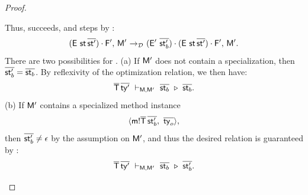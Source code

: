 {\begin{proof}
{\begin{itemize}
\begin{enumerate}
          Thus,  succeeds,
          and  steps by :
          \[
            \config{\stk{(\env\ \st\,\ol{\st'})}{\frm'}}{\mtbl'} \stepd
            \config{\stk{(\env'\ \ol{\st'_b})}{\stk{(\env\ \st\,\ol{\st'})}{\frm'}}}{\mtbl'}.
          \]
          There are two possibilities for .
          (a) If $\mathsf{M}'$ does not contain a specialization, then
          $\overline{\mathsf{st}'_b} = \overline{\mathsf{st}_b}$. By reflexivity of the optimization relation,
          we then have:
          \[
            \overline{\mathsf{T}}\,\overline{\mathsf{ty}'}\ \vdash_{\mathsf{M},\mathsf{M}'}\ \overline{\mathsf{st}_b}\ \triangleright\ \overline{\mathsf{st}_b}.
          \]
          (b) If $\mathsf{M}'$ contains a specialized method instance
          \[ \langle \mathsf{m}!{\overline{\mathsf{T}}}\,\overline{\mathsf{st}'_b},\ \overline{\mathsf{ty}_o} \rangle, \]
          then $\overline{\mathsf{st}'_b} \neq \epsilon$ by the assumption on $\mathsf{M}'$,
          and thus the desired relation is guaranteed by :
          \[
            \overline{\mathsf{T}}\,\overline{\mathsf{ty}'}\ \vdash_{\mathsf{M},\mathsf{M}'}\ \overline{\mathsf{st}_b}\ \triangleright\ \overline{\mathsf{st}'_b}.
          \]


\end{enumerate}
\end{itemize}}
\end{proof}}
